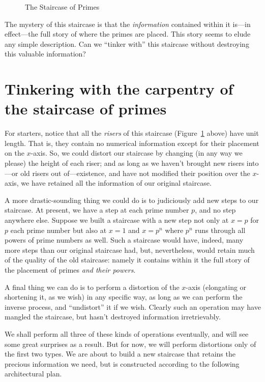 \documentclass[openany]{book}
\theoremstyle{plain}
\theoremstyle{definition}
\begin{document}
{{\begin{figure}[H]
\caption{The Staircase of Primes\label{fig:staircases}}
\end{figure}

The mystery of this staircase is that the {\em information} contained
within it is---in effect---the full story of where the primes are
placed. This story seems to elude any simple description.  Can we
``tinker with'' this staircase without destroying this valuable
information?




\chapter[Tinkering with the staircase of primes]{Tinkering with the carpentry of the staircase of primes\label{sec:tinkering}}


For starters, notice that all the {\em risers} of this staircase (Figure~\ref{fig:staircases} above) have
unit length. That is, they contain no numerical information except for
their placement on the $x$-axis. So, we could distort our staircase by
changing (in any way we please) the height of each riser; and as long
as we haven't brought new risers into---or old risers out
of---existence, and have not modified their position over the
$x$-axis, we have retained all the information of our original
staircase.


A more drastic-sounding thing we could do is to judiciously add new
steps to our staircase. At present, we have a step at each prime
number $p$, and no step anywhere else. Suppose we built a staircase
with a new step not only at $x=p$ for $p$ each prime number but also at
$x =1$ and $x=p^n$ where $p^n$ runs through all powers of prime numbers as
well. Such a staircase would have, indeed, many more steps than our
original staircase had, but, nevertheless, would retain much of the
quality of the old staircase: namely it contains within it the full
story of the placement of primes {\em and their powers}.

A final thing we can do is to perform a distortion of the $x$-axis
(elongating or shortening it, as we wish) in any specific way, as long
as we can perform the inverse process, and ``undistort'' it if we wish.
Clearly such an operation may have mangled the staircase, but hasn't destroyed
information irretrievably.

We shall perform all three of these kinds of operations eventually,
and will see some great surprises as a result.  But for now, we will
perform distortions only of the first two types.  We are about to
build a new staircase that retains the precious information we need,
but is constructed according to the following architectural plan.

}}
\end{document}
